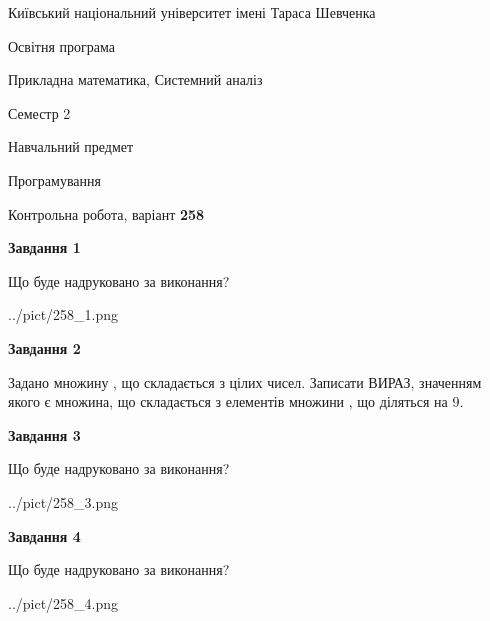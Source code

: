 \documentclass[12pt, ukrainian]{article}
\begin{document}
{{\begin {small}\par
{ \center  Київський національний університет імені Тараса Шевченка \par}
{\parbox {5 cm}{Освітня програма \hfill}{\parbox {8 cm}{Прикладна математика, Системний аналіз \hfill}}\parbox {5 cm}{\hfill Семестр 2}}\par
{\parbox {5 cm} {Навчальний предмет \hfill}\parbox {7 cm}{Програмування \hfill}\parbox {6cm}{\hfill}\par}\vspace{-7pt} \end{small}}{\center Контрольна робота, варіант  \No \textbf
{ 258 }\par}}
{
\begin {large}
{\begin {center}\textbf{Завдання 1}\end {center}}\par
Що буде надруковано за виконання?\par\par
\begin{center}
	{../pict/258_1.png}
\end{center}
\newpage

{\begin {center}\textbf{Завдання 2}\end {center}}\par
Задано множину , що складається з цілих чисел. Записати ВИРАЗ, значенням якого є множина, що складається  з елементів множини , що діляться на 9.\par
\newpage

{\begin {center}\textbf{Завдання 3}\end {center}}\par
Що буде надруковано за виконання?
\begin{center}
	{../pict/258_3.png}
\end{center}
\newpage

{\begin {center}\textbf{Завдання 4}\end {center}}\par
Що буде надруковано за виконання?\par
\begin{center}
	{../pict/258_4.png}
\end{center}
\newpage


\end{large}}
\end{document}
